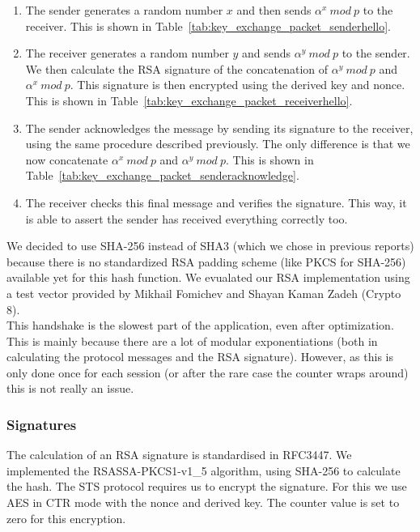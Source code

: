 \documentclass[a4paper]{article}
\begin{document}
\begin{enumerate}
    \item The sender generates a random number $x$ and then sends $\alpha^x\ mod\ p$ to the receiver. This is shown in Table~\ref{tab:key_exchange_packet_senderhello}.
    \item The receiver generates a random number $y$ and sends $\alpha^y\ mod\ p$ to the sender. We then calculate the RSA signature of the concatenation of $\alpha^y\ mod\ p$ and $\alpha^x\ mod\ p$. This signature is then encrypted using the derived key and nonce. This is shown in Table~\ref{tab:key_exchange_packet_receiverhello}.
    \item The sender acknowledges the message by sending its signature to the receiver, using the same procedure described previously. The only difference is that we now concatenate $\alpha^x\ mod\ p$ and $\alpha^y\ mod\ p$. This is shown in Table~\ref{tab:key_exchange_packet_senderacknowledge}.
    \item The receiver checks this final message and verifies the signature. This way, it is able to assert the sender has received everything correctly too.
\end{enumerate}

We decided to use SHA-256 instead of SHA3 (which we chose in previous reports) because there is no standardized RSA padding scheme (like PKCS for SHA-256) available yet for this hash function. We evualated our RSA implementation using a test vector provided by Mikhail Fomichev and Shayan Kaman Zadeh (Crypto 8).\\

This handshake is the slowest part of the application, even after optimization. This is mainly because there are a lot of modular exponentiations (both in calculating the protocol messages and the RSA signature). However, as this is only done once for each session (or after the rare case the counter wraps around) this is not really an issue.

\subsubsection{Signatures}

The calculation of an RSA signature is standardised in RFC3447. We implemented the RSASSA-PKCS1-v1\_5 algorithm, using SHA-256 to calculate the hash. The STS protocol requires us to encrypt the signature. For this we use AES in CTR mode with the nonce and derived key. The counter value is set to zero for this encryption.\\
\end{document}
